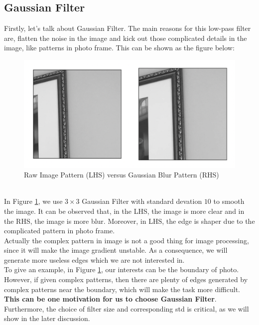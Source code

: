 \documentclass{article}
\begin{document}
\subsection{Gaussian Filter}
Firstly, let's talk about Gaussian Filter. The main reasons for this low-pass filter are, flatten the noise in the image and kick out those complicated details in the image, like patterns in photo frame. This can be shown as the figure below:
\begin{figure}[h]
	\centering
	\includegraphics[width=.45\textheight]{fig1.png}
	\caption{Raw Image Pattern (LHS) versus Gaussian Blur Pattern (RHS)}
	\label{fig:001}
\end{figure}
\\
In Figure \ref{fig:001}, we use $3\times 3$ Gaussian Filter with standard devation $10$ to smooth the image. It can be observed that, in the LHS, the image is more clear and in the RHS, the image is more blur. Moreover, in LHS, the edge is shaper due to the complicated pattern in photo frame.
\vspace{4pt}
\\
Actually the complex pattern in image is not a good thing for image processing, since it will make the image gradient unstable. As a consequence, we will generate more useless edges which we are not interested in.
\vspace{4pt}
\\
To give an example, in Figure \ref{fig:001}, our interests can be the boundary of photo. However, if given complex patterns, then there are plenty of edges generated by complex patterns near the boundary, which will make the task more difficult. \textbf{This can be one motivation for us to choose Gaussian Filter}. Furthermore, the choice of filter size and corresponding std is critical, as we will show in the later discussion.
\end{document}
